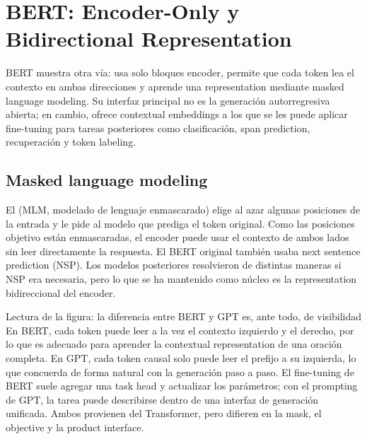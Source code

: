 \section{BERT: Encoder-Only y Bidirectional Representation}

BERT muestra otra vía: usa solo bloques encoder, permite que cada token lea el contexto en ambas direcciones y aprende una representation mediante masked language modeling. Su interfaz principal no es la generación autorregresiva abierta; en cambio, ofrece contextual embeddings a los que se les puede aplicar fine-tuning para tareas posteriores como clasificación, span prediction, recuperación y token labeling.

\subsection{Masked language modeling}

El  (MLM, modelado de lenguaje enmascarado) elige al azar algunas posiciones de la entrada y le pide al modelo que prediga el token original. Como las posiciones objetivo están enmascaradas, el encoder puede usar el contexto de ambos lados sin leer directamente la respuesta. El BERT original también usaba next sentence prediction (NSP). Los modelos posteriores resolvieron de distintas maneras si NSP era necesaria, pero lo que se ha mantenido como núcleo es la representation bidireccional del encoder.


\begin{knowledgebox}{Lectura de la figura: la diferencia entre BERT y GPT es, ante todo, de visibilidad}
En BERT, cada token puede leer a la vez el contexto izquierdo y el derecho, por lo que es adecuado para aprender la contextual representation de una oración completa. En GPT, cada token causal solo puede leer el prefijo a su izquierda, lo que concuerda de forma natural con la generación paso a paso. El fine-tuning de BERT suele agregar una task head y actualizar los parámetros; con el prompting de GPT, la tarea puede describirse dentro de una interfaz de generación unificada. Ambos provienen del Transformer, pero difieren en la mask, el objective y la product interface.
\end{knowledgebox}


